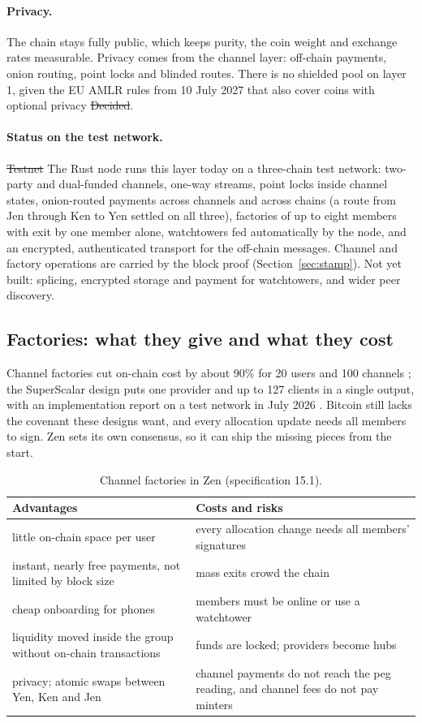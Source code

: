 \paragraph{Privacy.} The chain stays fully public, which keeps purity, the coin weight and exchange rates measurable. Privacy comes from the channel layer: off-chain payments, onion routing, point locks and blinded routes. There is no shielded pool on layer 1, given the EU AMLR rules from 10 July 2027 that also cover coins with optional privacy \st{Decided}.

\paragraph{Status on the test network.} \st{Testnet} The Rust node runs this layer today on a three-chain test network: two-party and dual-funded channels, one-way streams, point locks inside channel states, onion-routed payments across channels and across chains (a route from Jen through Ken to Yen settled on all three), factories of up to eight members with exit by one member alone, watchtowers fed automatically by the node, and an encrypted, authenticated transport for the off-chain messages. Channel and factory operations are carried by the block proof (Section~\ref{sec:stamp}). Not yet built: splicing, encrypted storage and payment for watchtowers, and wider peer discovery.

\subsection{Factories: what they give and what they cost}
Channel factories cut on-chain cost by about 90\% for 20 users and 100 channels \cite{burchert}; the SuperScalar design puts one provider and up to 127 clients in a single output, with an implementation report on a test network in July 2026 \cite{superscalar}. Bitcoin still lacks the covenant these designs want, and every allocation update needs all members to sign. Zen sets its own consensus, so it can ship the missing pieces from the start.

\begin{table}[htbp]
\centering\small
\begin{tabularx}{\textwidth}{Y Y}
\toprule
\textbf{Advantages} & \textbf{Costs and risks}\\
\midrule
little on-chain space per user & every allocation change needs all members' signatures\\
instant, nearly free payments, not limited by block size & mass exits crowd the chain\\
cheap onboarding for phones & members must be online or use a watchtower\\
liquidity moved inside the group without on-chain transactions & funds are locked; providers become hubs\\
privacy; atomic swaps between Yen, Ken and Jen & channel payments do not reach the peg reading, and channel fees do not pay minters\\
\bottomrule
\end{tabularx}
\caption{Channel factories in Zen (specification 15.1).}
\end{table}

